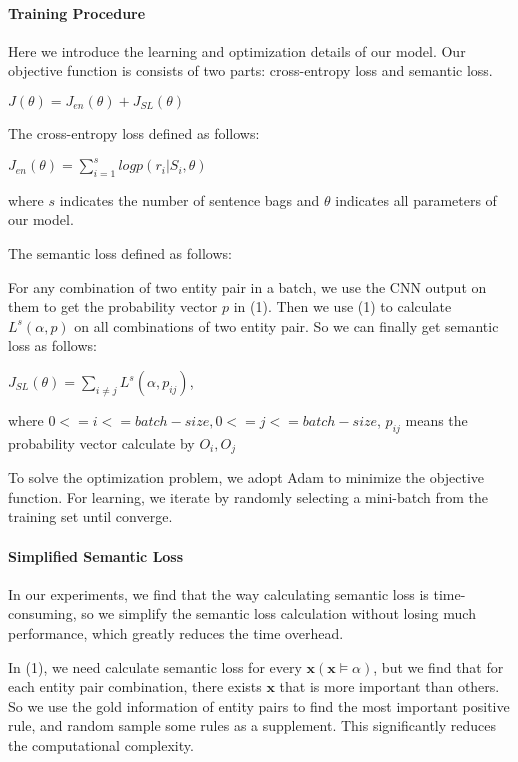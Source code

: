 \paragraph{Training Procedure}
Here we introduce the learning and optimization details of our model. Our objective function is consists of two parts: cross-entropy loss and semantic loss.
\begin{center}
	$ J(\theta) = J_{en}(\theta) + J_{SL}(\theta)$
\end{center}

The cross-entropy loss defined as follows:
\begin{center}
	$ J_{en}(\theta)= \sum\limits_{i=1}^{s}logp(r_i|S_i, \theta)$	
\end{center}
where $ s $ indicates the number of sentence bags and $ \theta $ indicates all parameters of our model.

The semantic loss defined as follows:

For any combination of two entity pair in a batch, we use the CNN output on them to get the probability vector $ p $ in (1). Then we use (1) to calculate $L^{s}(\alpha, p)$ on all combinations of two entity pair. So we can finally get semantic loss as follows:
\begin{center}
	$ J_{SL}(\theta) = \sum\limits_{i \neq j}L^{s}(\alpha, p_{ij}) $,
\end{center}
where $0<=i<=batch-size, 0<=j<=batch-size$, $ p_{ij} $ means the probability vector calculate by $ O_i, O_j $

To solve the optimization problem, we adopt Adam \cite{kingma2014adam} to minimize the objective function. For learning, we iterate by randomly selecting a mini-batch from the training set until converge.
\paragraph{Simplified Semantic Loss}

In our experiments, we find that the way \cite{xu2017semantic} calculating semantic loss is time-consuming, so we simplify the semantic loss calculation without losing much performance, which greatly reduces the time overhead.

In (1), we need calculate semantic loss for every $ \bm x (\bm x \models \alpha)$, but we find that for each entity pair combination, there exists $ \bm x $ that is more important than others. So we use the gold information of entity pairs to find the most important positive rule, and random sample some rules as a supplement. This significantly reduces the computational complexity.

